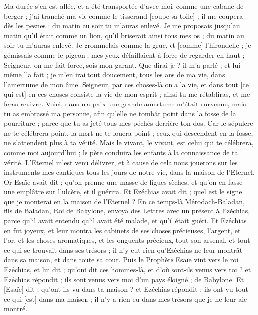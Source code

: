 \begin{multicols}{2}
Ma durée s'en est allée, et a été transportée d'avec moi, comme une cabane de berger ; j'ai tranché ma vie comme le tisserand [coupe sa toile] ; il me coupera dès les pesnes : du matin au soir tu m'auras enlevé.
Je me proposais jusqu'au matin qu'il était comme un lion, qu'il briserait ainsi tous mes os ; du matin au soir tu m'auras enlevé.
Je grommelais comme la grue, et [comme] l'hirondelle ; je gémissais comme le pigeon ; mes yeux défaillaient à force de regarder en haut ; Seigneur, on me fait force, sois mon garant.
Que dirai-je ? il m'a parlé ; et lui même l'a fait ; je m'en irai tout doucement, tous les ans de ma vie, dans l'amertume de mon âme.
Seigneur, par ces choses-là on a la vie, et dans tout [ce qui est] en ces choses consiste la vie de mon esprit ; ainsi tu me rétabliras, et me feras revivre.
Voici, dans ma paix une grande amertume m'était survenue, mais tu as embrassé ma personne, afin qu'elle ne tombât point dans la fosse de la pourriture ; parce que tu as jeté tous mes péchés derrière ton dos.
Car le sépulcre ne te célébrera point, la mort ne te louera point ; ceux qui descendent en la fosse, ne s'attendent plus à ta vérité.
Mais le vivant, le vivant, est celui qui te célébrera, comme moi aujourd'hui ; le père conduira les enfants à la connaissance de ta vérité.
L'Eternel m'est venu délivrer, et à cause de cela nous jouerons sur les instruments mes cantiques tous les jours de notre vie, dans la maison de l'Eternel.
Or Esaïe avait dit ; qu'on prenne une masse de figues sèches, et qu'on en fasse une emplâtre sur l'ulcère, et il guérira.
Et Ezéchias avait dit ; quel est le signe que je monterai en la maison de l'Eternel ?
\VerseOne{}En ce temps-là Mérodach-Baladan, fils de Baladan, Roi de Babylone, envoya des Lettres avec un présent à Ezéchias, parce qu'il avait entendu qu'il avait été malade, et qu'il était guéri.
Et Ezéchias en fut joyeux, et leur montra les cabinets de ses choses précieuses, l'argent, et l'or, et les choses aromatiques, et les onguents précieux, tout son arsenal, et tout ce qui se trouvait dans ses trésors ; il n'y eut rien qu'Ezéchias ne leur montrât dans sa maison, et dans toute sa cour.
Puis le Prophète Esaïe vint vers le roi Ezéchias, et lui dit ; qu'ont dit ces hommes-là, et d'où sont-ils venus vers toi ? et Ezéchias répondit ; ils sont venus vers moi d'un pays éloigné ; de Babylone.
Et [Esaïe] dit ; qu'ont-ils vu dans ta maison ? et Ezéchias répondit ; ils ont vu tout ce qui [est] dans ma maison ; il n'y a rien eu dans mes trésors que je ne leur aie montré.

\end{multicols}
